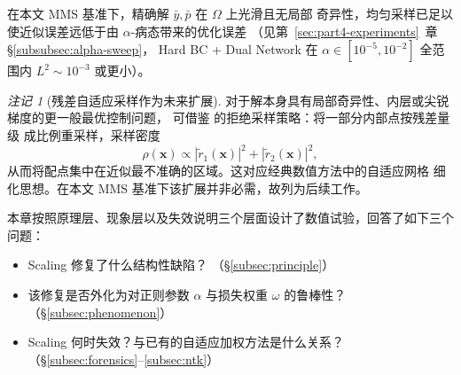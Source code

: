 \documentclass{xmu}
\theoremstyle{plain}
\theoremstyle{remark}
\newtheorem{remark}[theorem]{注记}
\begin{document}
在本文 MMS 基准下，精确解 $\bar y, \bar p$ 在 $\Omega$ 上光滑且无局部
奇异性，均匀采样已足以使近似误差远低于由 $\alpha$-病态带来的优化误差
（见第~\ref{sec:part4-experiments}~章 §\ref{subsubsec:alpha-sweep}，
Hard BC + Dual Network 在 $\alpha\in[10^{-5},10^{-2}]$ 全范围内
$L^2\sim 10^{-3}$ 或更小）。
 
\begin{remark}[残差自适应采样作为未来扩展]
对于解本身具有局部奇异性、内层或尖锐梯度的更一般最优控制问题，
可借鉴\cite[算法 2.3]{5} 的拒绝采样策略：将一部分内部点按残差量级
成比例重采样，采样密度
\begin{equation}
\rho(\mathbf{x}) \propto |\tilde r_1(\mathbf{x})|^2+|\tilde r_2(\mathbf{x})|^2,
\end{equation}
从而将配点集中在近似最不准确的区域。这对应经典数值方法中的自适应网格
细化思想。在本文 MMS 基准下该扩展并非必需，故列为后续工作。
\end{remark}

%

\label{sec:part4-experiments}

本章按照原理层、现象层以及失效说明三个层面设计了数值试验，回答了如下三个问题：
\begin{itemize}
  \item Scaling 修复了什么结构性缺陷？
        （§\ref{subsec:principle}）
  \item 该修复是否外化为对正则参数 $\alpha$ 与损失权重 $\omega$ 的鲁棒性？
        （§\ref{subsec:phenomenon}）
  \item Scaling 何时失效？与已有的自适应加权方法是什么关系？
        （§\ref{subsec:forensics}--\ref{subsec:ntk}）
\end{itemize}
\end{document}
